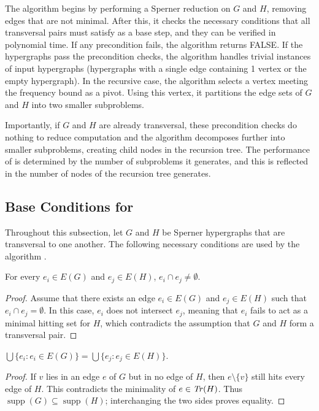 The algorithm begins by performing a Sperner reduction on $G$ and $H$, removing edges that are not minimal. After this, it checks the necessary conditions that all transversal pairs must satisfy as a base step, and they can be verified in polynomial time. If any precondition fails, the algorithm returns FALSE. If the hypergraphs pass the precondition checks, the algorithm handles trivial instances of input hypergraphs (hypergraphs with a single edge containing 1 vertex or the empty hypergraph). In the recursive case, the algorithm selects a vertex meeting the frequency bound as a pivot. Using this vertex, it partitions the edge sets of $G$ and $H$ into two smaller subproblems.

Importantly, if $G$ and $H$ are already transversal, these precondition checks do nothing to reduce computation and the algorithm decomposes further into smaller subproblems, creating child nodes in the recursion tree. The performance of \FKA{} is determined by the number of subproblems it generates, and this is reflected in the number of nodes of the recursion tree \FKA{} generates.

\cite{FK96}

\subsection{Base Conditions for \FKA}

Throughout this subsection, let $G$ and $H$ be Sperner hypergraphs that are transversal to one another. The following necessary conditions are used by the algorithm \cite{DNU21,FK96}.

\begin{proposition}\label{prop:intersect}
For every $e_i\in E(G)$ and $e_j\in E(H)$, $e_i\cap e_j\neq\emptyset$.
\end{proposition}

\begin{proof}
Assume that there exists an edge $e_i\in E(G)$ and $e_j\in E(H)$ such that $e_i\cap e_j=\emptyset$. In this case, $e_i$ does not intersect $e_j$, meaning that $e_i$ fails to act as a minimal hitting set for $H$, which contradicts the assumption that $G$ and $H$ form a transversal pair.
\end{proof}

\begin{proposition}\label{prop:support}
$\bigcup\{e_i:e_i\in E(G)\}=\bigcup\{e_j:e_j\in E(H)\}$.
\end{proposition}

\begin{proof}
If $v$ lies in an edge $e$ of $G$ but in no edge of $H$, then
$e\setminus\{v\}$ still hits every edge of $H$. This contradicts the minimality
of $e\in\mathit{Tr}(H)$. Thus $\operatorname{supp}(G)\subseteq\operatorname{supp}(H)$;
interchanging the two sides proves equality.
\end{proof}

